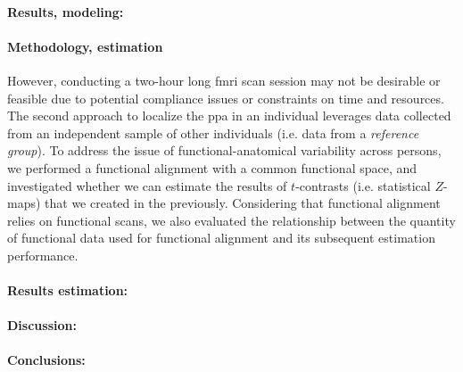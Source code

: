 \paragraph{Results, modeling:}

\paragraph{Methodology, estimation}

%
However, conducting a two-hour long \ac{fmri} scan session may not be desirable
or feasible due to potential compliance issues or constraints on time and
resources.
%
The second approach to localize the \ac{ppa} in an individual leverages data
collected from an independent sample of other individuals (i.e.  data from a
\textit{reference group}).
To address the issue of functional-anatomical variability across persons, we
performed a functional alignment with a common functional space, and investigated
whether we can estimate the results of $t$-contrasts (i.e. statistical
$Z$-maps) that we created in the previously.
%
Considering that functional alignment relies on functional scans, we also
evaluated the relationship between the quantity of functional data used for
functional alignment and its subsequent estimation performance.

\paragraph{Results estimation:}

\paragraph{Discussion:}

\paragraph{Conclusions:}
